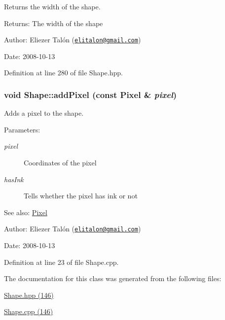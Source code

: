 Returns the width of the shape. 

\begin{Desc}
\item[Returns:]The width of the shape\end{Desc}
\begin{Desc}
\item[Author:]Eliezer Talón (\href{mailto:elitalon@gmail.com}{\tt elitalon@gmail.com}) \end{Desc}
\begin{Desc}
\item[Date:]2008-10-13 \end{Desc}


Definition at line 280 of file Shape.hpp.\hypertarget{class_shape_f6114234203d9473f1fef9e6391f9243}{
\subsubsection[addPixel]{\setlength{\rightskip}{0pt plus 5cm}void Shape::addPixel (const {\bf Pixel} \& {\em pixel})}}
\label{class_shape_f6114234203d9473f1fef9e6391f9243}


Adds a pixel to the shape. 

\begin{Desc}
\item[Parameters:]
\begin{description}
\item[{\em pixel}]Coordinates of the pixel \item[{\em hasInk}]Tells whether the pixel has ink or not\end{description}
\end{Desc}
\begin{Desc}
\item[See also:]\hyperlink{_pixel_8hpp_535e59456e3e633842529cfa8ea103c4}{Pixel}\end{Desc}
\begin{Desc}
\item[Author:]Eliezer Talón (\href{mailto:elitalon@gmail.com}{\tt elitalon@gmail.com}) \end{Desc}
\begin{Desc}
\item[Date:]2008-10-13 \end{Desc}


Definition at line 23 of file Shape.cpp.

The documentation for this class was generated from the following files:\begin{CompactItemize}
\item 
\hyperlink{_shape_8hpp}{Shape.hpp (146)}\item 
\hyperlink{_shape_8cpp}{Shape.cpp (146)}\end{CompactItemize}
